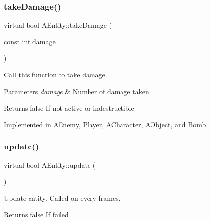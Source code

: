 \subsubsection{\texorpdfstring{take\+Damage()}{takeDamage()}}
{\footnotesize\ttfamily virtual bool A\+Entity\+::take\+Damage (\begin{DoxyParamCaption}\item[{const int}]{damage }\end{DoxyParamCaption})\hspace{0.3cm}{\ttfamily [pure virtual]}}



Call this function to take damage. 


\begin{DoxyParams}{Parameters}
{\em damage} & Number of damage taken \\
\hline
\end{DoxyParams}
\begin{DoxyReturn}{Returns}
false If not active or indestructible 
\end{DoxyReturn}


Implemented in \hyperlink{class_a_enemy_a17bcf116c42c3d780e243127adf1a947}{A\+Enemy}, \hyperlink{class_player_a029b1d511340697d8ccfb7bfa604435b}{Player}, \hyperlink{class_a_character_a1ab94580e4db621f79f0bf1d6bcdb600}{A\+Character}, \hyperlink{class_a_object_a39b1720ae5a820512ab4db0906f03b15}{A\+Object}, and \hyperlink{class_bomb_ac51b260cdfef0cde903a88003994276e}{Bomb}.

\mbox{\label{class_a_entity_adcfd3958ca43b8efd7cc58e7106a26a8}} 
\subsubsection{\texorpdfstring{update()}{update()}}
{\footnotesize\ttfamily virtual bool A\+Entity\+::update (\begin{DoxyParamCaption}{ }\end{DoxyParamCaption})\hspace{0.3cm}{\ttfamily [pure virtual]}}



Update entity. Called on every frames. 

\begin{DoxyReturn}{Returns}
false If failed 
\end{DoxyReturn}



